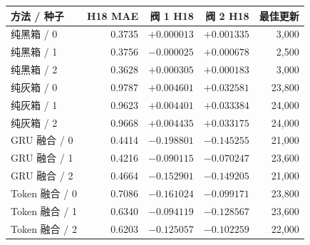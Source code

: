 \begin{tabular}{lrrrr}
\toprule
方法 / 种子 & H18 MAE & 阀 1 H18 & 阀 2 H18 & 最佳更新\\
\midrule
纯黑箱 / 0 & 0.3735 & $+0.000013$ & $+0.001335$ & 3,000 \\
纯黑箱 / 1 & 0.3756 & $-0.000025$ & $+0.000678$ & 2,500 \\
纯黑箱 / 2 & 0.3628 & $+0.000305$ & $+0.000183$ & 3,000 \\
纯灰箱 / 0 & 0.9787 & $+0.004601$ & $+0.032581$ & 23,800 \\
纯灰箱 / 1 & 0.9623 & $+0.004401$ & $+0.033384$ & 24,000 \\
纯灰箱 / 2 & 0.9668 & $+0.004435$ & $+0.033175$ & 24,000 \\
GRU 融合 / 0 & 0.4414 & $-0.198801$ & $-0.145255$ & 21,000 \\
GRU 融合 / 1 & 0.4216 & $-0.090115$ & $-0.070247$ & 23,600 \\
GRU 融合 / 2 & 0.4664 & $-0.152901$ & $-0.149205$ & 21,000 \\
Token 融合 / 0 & 0.7086 & $-0.161024$ & $-0.099171$ & 23,800 \\
Token 融合 / 1 & 0.6340 & $-0.094119$ & $-0.128567$ & 23,600 \\
Token 融合 / 2 & 0.6203 & $-0.125057$ & $-0.102259$ & 22,000 \\
\bottomrule
\end{tabular}
